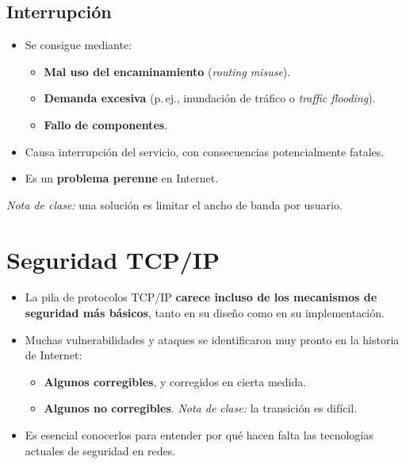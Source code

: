 \documentclass[11pt,a4paper]{report}
\begin{document}
\section{Interrupción}
 
\begin{itemize}
  \item Se consigue mediante:
    \begin{itemize}
      \item \textbf{Mal uso del encaminamiento} (\emph{routing misuse}).
      \item \textbf{Demanda excesiva} (p.\,ej., inundación de tráfico o \emph{traffic flooding}).
      \item \textbf{Fallo de componentes}.
    \end{itemize}
  \item Causa interrupción del servicio, con consecuencias potencialmente fatales.
  \item Es un \textbf{problema perenne} en Internet.
\end{itemize}
 
\noindent\emph{Nota de clase:} una solución es limitar el ancho de banda por usuario.
 
\chapter{Seguridad TCP/IP}
 
\begin{itemize}
  \item La pila de protocolos TCP/IP \textbf{carece incluso de los mecanismos de seguridad más básicos}, tanto en su diseño como en su implementación.
  \item Muchas vulnerabilidades y ataques se identificaron muy pronto en la historia de Internet:
    \begin{itemize}
      \item \textbf{Algunos corregibles}, y corregidos en cierta medida.
      \item \textbf{Algunos no corregibles}. \emph{Nota de clase:} la transición es difícil.
    \end{itemize}
  \item Es esencial conocerlos para entender por qué hacen falta las tecnologías actuales de seguridad en redes.
\end{itemize}
 
\end{document}
